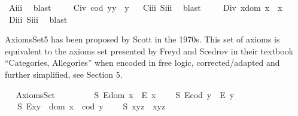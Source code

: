 \begin{isabellebody}
\ A\isactrlsub i\isactrlsub i\isactrlsub i\ \isamarkupfalse%
\ blast%
\endisatagproof
{\isafoldproof}%
%
\isadelimproof
%
\endisadelimproof
\isanewline
\ \ \ \isamarkupfalse%
\ C\isactrlsub i\isactrlsub v{\isacharcolon}\ {\isachardoublequoteopen}{\isacharparenleft}cod\ y{\isacharparenright}{\isasymcdot}y\ {\isasymcong}\ y{\isachardoublequoteclose}%
\isadelimproof
\ %
\endisadelimproof
%
\isatagproof
{}\isamarkupfalse%
\ C\isactrlsub i\isactrlsub i\isactrlsub i\ S\isactrlsub i\isactrlsub i\isactrlsub i\ \isamarkupfalse%
\ blast%
\endisatagproof
{\isafoldproof}%
%
\isadelimproof
%
\endisadelimproof
\isanewline
\ \ \ \isamarkupfalse%
\ D\isactrlsub i\isactrlsub v{\isacharcolon}\ {\isachardoublequoteopen}x{\isasymcdot}{\isacharparenleft}dom\ x{\isacharparenright}\ {\isasymcong}\ x{\isachardoublequoteclose}%
\isadelimproof
\ %
\endisadelimproof
%
\isatagproof
{}\isamarkupfalse%
\ D\isactrlsub i\isactrlsub i\isactrlsub i\ S\isactrlsub i\isactrlsub i\isactrlsub i\ \isamarkupfalse%
\ blast%
\endisatagproof
{\isafoldproof}%
%
\isadelimproof
%
\endisadelimproof
\isanewline
\ \ \isamarkupfalse%
%
\isamarkuptrue%
%
\begin{isamarkuptext}%
AxiomsSet5 has been proposed by Scott \cite{Scott79} in the 1970s. This set of
 axioms is equivalent to the axioms set presented by Freyd and Scedrov in their textbook
 ``Categories, Allegories'' \cite{FreydScedrov90} when encoded in free logic, corrected/adapted 
 and further simplified, see Section 5.%
\end{isamarkuptext}\isamarkuptrue%
\ \isamarkupfalse%
\ AxiomsSet{}\ {\isacharequal}\ \isanewline
\ \ \ \isanewline
\ \ \ S{}{\isacharcolon}\ {\isachardoublequoteopen}E{\isacharparenleft}dom\ x{\isacharparenright}\ \isactrlbold {\isasymrightarrow}\ E\ x{\isachardoublequoteclose}\ \isanewline
\ \ \ S{}{\isacharcolon}\ {\isachardoublequoteopen}E{\isacharparenleft}cod\ y{\isacharparenright}\ \isactrlbold {\isasymrightarrow}\ E\ y{\isachardoublequoteclose}\ \isanewline
\ \ \ S{}{\isacharcolon}\ {\isachardoublequoteopen}E{\isacharparenleft}x{\isasymcdot}y{\isacharparenright}\ \isactrlbold {\isasymleftrightarrow}\ dom\ x\ {\isasymsimeq}\ cod\ y{\isachardoublequoteclose}\ \isanewline
\ \ \ S{}{\isacharcolon}\ {\isachardoublequoteopen}x{\isasymcdot}{\isacharparenleft}y{\isasymcdot}z{\isacharparenright}\ {\isasymcong}\ {\isacharparenleft}x{\isasymcdot}y{\isacharparenright}{\isasymcdot}z{\isachardoublequoteclose}\ \isanewline

\end{isabellebody}
